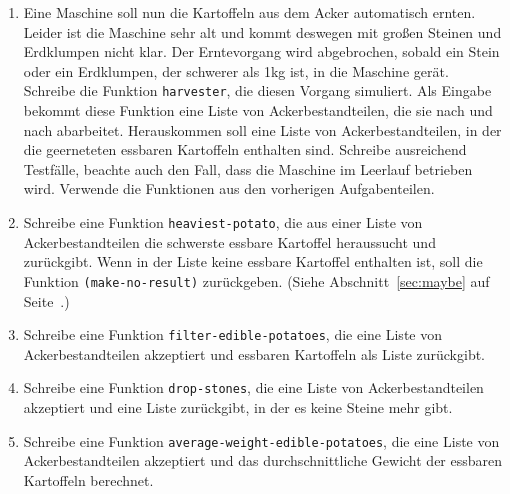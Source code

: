\begin{aufgabe}
\begin{enumerate}
  \item Eine Maschine soll nun die Kartoffeln aus dem
    Acker automatisch ernten.  Leider ist die Maschine sehr alt und
    kommt deswegen mit großen Steinen und Erdklumpen nicht klar.  Der
    Erntevorgang wird abgebrochen, sobald ein Stein oder ein
    Erdklumpen, der schwerer als 1kg ist, in die Maschine gerät.
    Schreibe die Funktion \lstinline{harvester}, die diesen Vorgang
    simuliert. Als Eingabe bekommt diese Funktion eine Liste von
    Ackerbestandteilen, die sie nach und nach abarbeitet.
    Herauskommen soll eine Liste von Ackerbestandteilen, in der die
    geerneteten essbaren Kartoffeln enthalten sind.  Schreibe
    ausreichend Testfälle, beachte auch den Fall, dass die
    Maschine im Leerlauf betrieben wird.  Verwende die Funktionen
    aus den vorherigen Aufgabenteilen.

  \item Schreibe eine Funktion
    \lstinline{heaviest-potato}, die aus einer Liste von
    Ackerbestandteilen die schwerste essbare Kartoffel heraussucht und
    zurückgibt.  Wenn in der Liste keine essbare Kartoffel enthalten ist, soll
    die Funktion \lstinline{(make-no-result)} zurückgeben. (Siehe
    Abschnitt~\ref{sec:maybe} auf Seite~\pageref{sec:maybe}.)

    \item Schreibe eine Funktion
      \lstinline{filter-edible-potatoes}, die eine Liste von
      Ackerbestandteilen akzeptiert und essbaren Kartoffeln als Liste
      zurückgibt.

    \item Schreibe eine Funktion
      \lstinline{drop-stones}, die eine Liste von Ackerbestandteilen
      akzeptiert und eine Liste zurückgibt, in der es keine Steine mehr
      gibt.

    \item Schreibe eine Funktion
      \lstinline{average-weight-edible-potatoes}, die eine Liste von
      Ackerbestandteilen akzeptiert und das durchschnittliche Gewicht
      der essbaren Kartoffeln berechnet.

  \end{enumerate}
  
\end{aufgabe}

